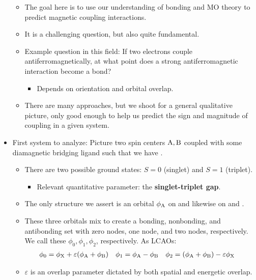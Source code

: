 \documentclass[../notes.tex]{subfiles}
\begin{document}
\begin{itemize}
    \begin{itemize}
        \item The goal here is to use our understanding of bonding and MO theory to predict magnetic coupling interactions.
        \item It is a challenging question, but also quite fundamental.
        \item Example question in this field: If two electrons couple antiferromagnetically, at what point does a strong antiferromagnetic interaction become a bond?
        \begin{itemize}
            \item Depends on orientation and orbital overlap.
        \end{itemize}
        \item There are many approaches, but we shoot for a general qualitative picture, only good enough to help us predict the sign and magnitude of coupling in a given system.
    \end{itemize}
    \item First system to analyze: Picture two spin centers $\ce{A},\ce{B}$ coupled with some diamagnetic bridging ligand  such that we have .
    \begin{itemize}
        \item There are two possible ground states: $S=0$ (singlet) and $S=1$ (triplet).
        \begin{itemize}
            \item Relevant quantitative parameter: the \textbf{singlet-triplet gap}.
        \end{itemize}
        \item The only structure we assert is an orbital $\phi_{\ce{A}}$ on  and likewise on  and .
        \item These three orbitals mix to create a bonding, nonbonding, and antibonding set with zero nodes, one node, and two nodes, respectively. We call these $\phi_0,\phi_1,\phi_2$, respectively. As LCAOs:
        \begin{align*}
            \phi_0 &= \phi_{\ce{X}}+\varepsilon(\phi_{\ce{A}}+\phi_{\ce{B}})&
            \phi_1 &= \phi_{\ce{A}}-\phi_{\ce{B}}&
            \phi_2 &= (\phi_{\ce{A}}+\phi_{\ce{B}})-\varepsilon\phi_{\ce{X}}
        \end{align*}
        \item $\varepsilon$ is an overlap parameter dictated by both spatial and energetic overlap.
        \begin{itemize}

\end{itemize}
\end{itemize}
\end{itemize}
\end{document}
